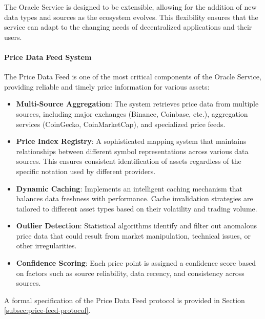 \documentclass{article}
\begin{document}
The Oracle Service is designed to be extensible, allowing for the addition of new data types and sources as the ecosystem evolves. This flexibility ensures that the service can adapt to the changing needs of decentralized applications and their users.



\paragraph{Price Data Feed System}
The Price Data Feed is one of the most critical components of the Oracle Service, providing reliable and timely price information for various assets:

\begin{itemize}
    \item \textbf{Multi-Source Aggregation}: The system retrieves price data from multiple sources, including major exchanges (Binance, Coinbase, etc.), aggregation services (CoinGecko, CoinMarketCap), and specialized price feeds.
    
    \item \textbf{Price Index Registry}: A sophisticated mapping system that maintains relationships between different symbol representations across various data sources. This ensures consistent identification of assets regardless of the specific notation used by different providers.
    
    \item \textbf{Dynamic Caching}: Implements an intelligent caching mechanism that balances data freshness with performance. Cache invalidation strategies are tailored to different asset types based on their volatility and trading volume.
    
    \item \textbf{Outlier Detection}: Statistical algorithms identify and filter out anomalous price data that could result from market manipulation, technical issues, or other irregularities.
    
    \item \textbf{Confidence Scoring}: Each price point is assigned a confidence score based on factors such as source reliability, data recency, and consistency across sources.
\end{itemize}

A formal specification of the Price Data Feed protocol is provided in Section \ref{subsec:price-feed-protocol}.


\end{document}
